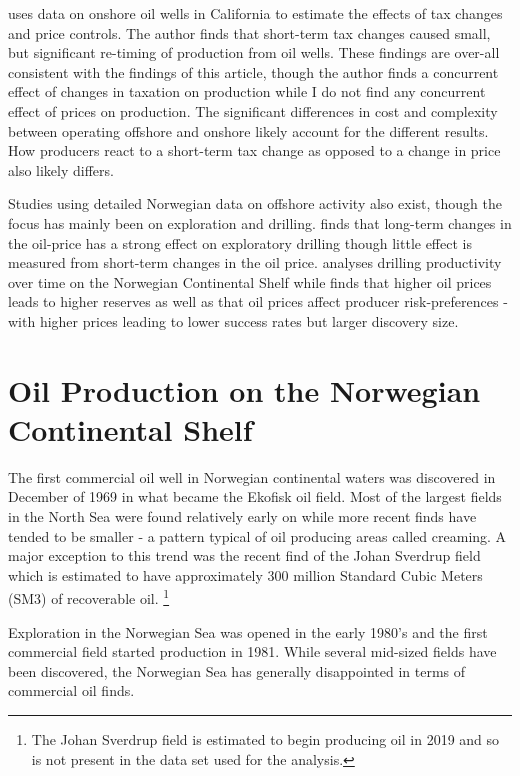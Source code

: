 \documentclass[11pt]{article}
\begin{document}
\citet{rao_taxation_2010} uses data on onshore oil wells in California to estimate the effects of tax changes and price controls. The author finds that short-term tax changes caused small, but significant re-timing of production from oil wells.  These findings are over-all consistent with the findings of this article, though the author finds a concurrent effect of changes in taxation on production while I do not find any concurrent effect of prices on production. The significant differences in cost and complexity between operating offshore and onshore likely account for the different results.  How producers react to a short-term tax change as opposed to a change in price also likely differs.

Studies using detailed Norwegian data on offshore activity also exist, though the focus has mainly been on exploration and drilling.  \citet{mohn_exploration_2008} finds that long-term changes in the oil-price has a strong effect on exploratory drilling though little effect is measured from short-term changes in the oil price.  \citet{osmundsen_exploration_2010} analyses drilling productivity over time on the Norwegian Continental Shelf while \citet{mohn_efforts_2008} finds that higher oil prices leads to higher reserves as well as that oil prices affect producer risk-preferences - with higher prices leading to lower success rates but larger discovery size.  

\section{Oil Production on the Norwegian Continental Shelf}

The first commercial oil well in Norwegian continental waters was discovered in December of 1969 in what became the Ekofisk oil field. Most of the largest fields in the North Sea were found relatively early on while more recent finds have tended to be smaller - a pattern typical of oil producing areas called creaming.  A major exception to this trend was the recent find of the Johan Sverdrup field which is estimated to have approximately 300 million Standard Cubic Meters (SM3) of recoverable oil. \footnote{The Johan Sverdrup field is estimated to begin producing oil in 2019 and so is not present in the data set used for the analysis.}  

Exploration in the Norwegian Sea was opened in the early 1980’s and the first commercial field started production in 1981.  While several mid-sized fields have been discovered, the Norwegian Sea has generally disappointed in terms of commercial oil finds.  
\end{document}

